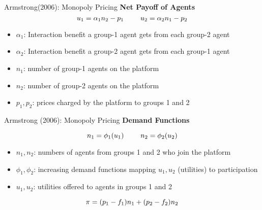 \documentclass[aspectratio=169]{beamer}  %
\begin{document}
\begin{frame}{Armstrong(2006): Monopoly Pricing}
    \textbf{Net Payoff of Agents}
    \vspace{1em}
    \begin{equation}
        \large
        u_{1} = \alpha_{1} n_{2} - p_{1}
            \qquad
        u_{2} = \alpha_{2} n_{1} - p_{2}
    \end{equation}
    \begin{itemize}
      \item $\alpha_{1}$: Interaction benefit a group-1 agent gets from each group-2 agent
      \item $\alpha_{2}$: Interaction benefit a group-2 agent gets from each group-1 agent
      \item $n_{1}$: number of group-1 agents on the platform
      \item $n_{2}$: number of group-2 agents on the platform
      \item $p_{1}, p_{2}$: prices charged by the platform to groups 1 and 2
    \end{itemize}
\end{frame}

\begin{frame}{Armstrong (2006): Monopoly Pricing}
    \textbf{Demand Functions}
    \vspace{1em}
    
    \begin{equation}
        \large
        n_{1} = \phi_{1}(u_{1})
        \qquad
        n_{2} = \phi_{2}(u_{2})
    \end{equation}
    
    \begin{itemize}
      \item $n_{1}, n_{2}$: numbers of agents from groups 1 and 2 
                            who join the platform
      \item $\phi_{1}, \phi_{2}$: increasing demand functions mapping 
                                  $u_{1}, u_{2}$ (utilities) to participation
      \item $u_{1}, u_{2}$: utilities offered to agents in groups 1 and 2
    \end{itemize}
    \vspace{1em}
    \begin{equation*}
        \large
        \pi = (p_1 - f_1)n_1 + (p_2 - f_2) n_2
    \end{equation*}
\end{frame}
\end{document}
